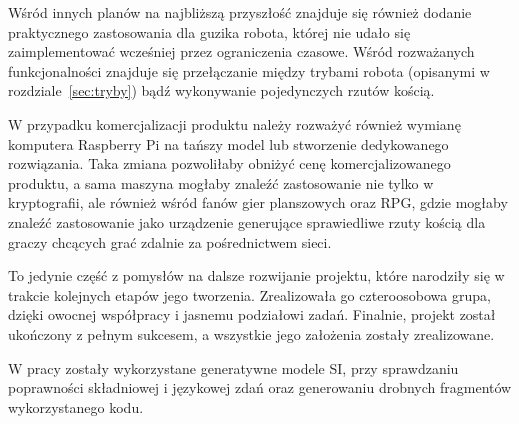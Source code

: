 Wśród innych planów na najbliższą przyszłość znajduje się również dodanie praktycznego zastosowania dla guzika robota,
której nie udało się zaimplementować wcześniej przez ograniczenia czasowe. Wśród rozważanych funkcjonalności znajduje się
przełączanie między trybami robota (opisanymi w rozdziale~\ref{sec:tryby}) bądź wykonywanie pojedynczych rzutów kością.

W przypadku komercjalizacji produktu należy rozważyć również wymianę komputera Raspberry Pi na tańszy model lub stworzenie dedykowanego rozwiązania.
Taka zmiana pozwoliłaby obniżyć cenę komercjalizowanego produktu, a sama maszyna mogłaby znaleźć zastosowanie nie tylko w kryptografii,
ale również wśród fanów gier planszowych oraz RPG, gdzie mogłaby znaleźć zastosowanie jako urządzenie generujące sprawiedliwe rzuty kością
dla graczy chcących grać zdalnie za pośrednictwem sieci.

To jedynie część z pomysłów na dalsze rozwijanie projektu, które narodziły się w trakcie kolejnych etapów jego tworzenia.
Zrealizowała go czteroosobowa grupa, dzięki owocnej współpracy i jasnemu podziałowi zadań. 
Finalnie, projekt został ukończony z pełnym sukcesem, a wszystkie jego założenia zostały zrealizowane.

W pracy zostały wykorzystane generatywne modele SI, przy sprawdzaniu poprawności składniowej i językowej zdań oraz generowaniu drobnych fragmentów wykorzystanego kodu.

